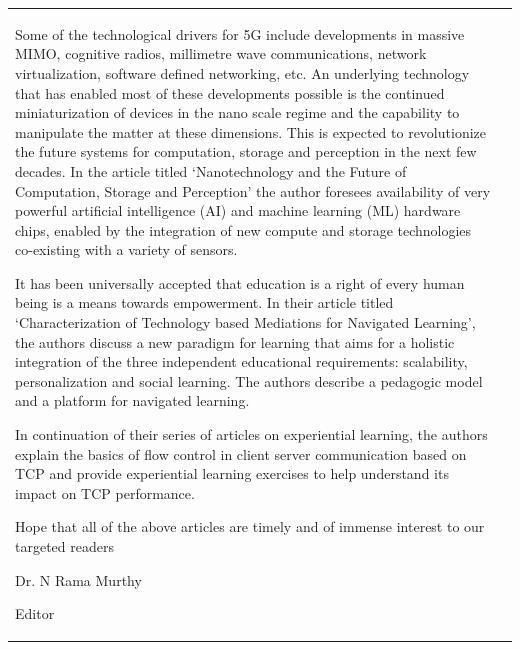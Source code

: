 {\begin{tabular}{p{.2\paperwidth}@{}!{\color{goldan-yellow}\vline width .9pt}p{.64\paperwidth}}
\bigskip

Some of the technological drivers for 5G include developments in massive MIMO, cognitive radios, millimetre wave communications, network virtualization, software defined networking, etc. An underlying technology that has enabled most of these developments possible is the continued miniaturization of devices in the nano scale regime and the capability to manipulate the matter at these dimensions. This is expected to revolutionize the future systems for computation, storage and perception in the next few decades. In the article titled ‘Nanotechnology and the Future of Computation, Storage and Perception’ the author foresees availability of very powerful artificial intelligence (AI) and machine learning (ML) hardware chips, enabled by the integration of new compute and storage technologies co-existing with a variety of sensors.  

\bigskip

It has been universally accepted that education is a right of every human being is a means towards empowerment. In their article titled ‘Characterization of Technology based Mediations for Navigated Learning’, the authors discuss a new paradigm for learning that aims for a holistic integration of the three independent educational requirements: scalability, personalization and social learning. The authors describe a pedagogic model and a platform for navigated learning.  

\bigskip

In continuation of their series of articles on experiential learning, the authors explain the basics of flow control in client server communication based on TCP and provide experiential learning exercises to help understand its impact on TCP performance.

\bigskip

Hope that all of the above articles are timely and of immense interest to our targeted readers 


\bigskip

\hfill  Dr. N Rama Murthy\hspace{1cm}\,

\vskip 2pt

\hfill Editor\hspace{3.15cm}\,

\end{tabular}
}





